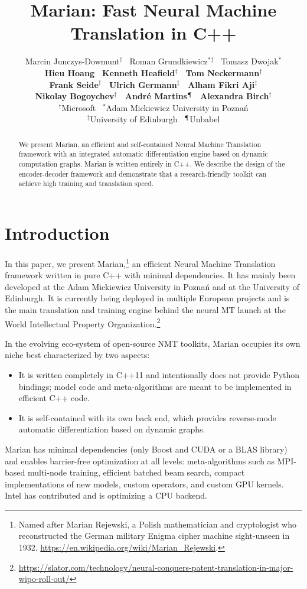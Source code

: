 \documentclass[11pt,a4paper]{article}
\title{Marian: Fast Neural Machine Translation in C++}
\author{Marcin Junczys-Dowmunt$^{\dagger}$ \, Roman Grundkiewicz$^{*}$$^{\ddagger}$ \, Tomasz Dwojak$^{*}$ \\ {\bf Hieu Hoang \, Kenneth Heafield$^{\ddagger}$ \, Tom Neckermann$^{\ddagger}$ }  \\  {\bf Frank Seide$^{\dagger}$ \, Ulrich Germann$^{\ddagger}$ \, Alham Fikri Aji$^{\ddagger}$ } \\ { \bf Nikolay Bogoychev$^{\ddagger}$ \, Andr\'{e} Martins$^{\mathparagraph}$ \, Alexandra Birch$^{\ddagger}$} \\[2mm]
$^{\dagger}$Microsoft \, $^{*}$Adam Mickiewicz University in Pozna\'{n} \\ $^{\ddagger}$University of Edinburgh \,  $^{\mathparagraph}$Unbabel }
\date{}
\begin{document}
\maketitle
\begin{abstract}
We present Marian, an efficient and self-contained Neural Machine Translation framework with an integrated automatic differentiation engine based on dynamic computation graphs. Marian is written entirely in C++. We describe the design of the encoder-decoder framework and demonstrate that a research-friendly toolkit can achieve high training and translation speed.  
\end{abstract}

\section{Introduction}

In this paper, we present Marian,\footnote{Named after Marian Rejewski, a Polish mathematician and cryptologist who reconstructed the German military Enigma cipher machine sight-unseen in 1932. \url{https://en.wikipedia.org/wiki/Marian_Rejewski}.} an efficient Neural Machine Translation framework written in pure C++ with minimal dependencies. It has mainly been developed at the Adam Mickiewicz University in Pozna\'{n} and at the University of Edinburgh. It is currently being deployed in multiple European projects and is the main translation and training engine behind the neural MT launch at the World Intellectual Property Organization.\footnote{\url{https://slator.com/technology/neural-conquers-patent-translation-in-major-wipo-roll-out/}}

In the evolving eco-system of open-source NMT toolkits, Marian occupies its own niche best characterized by two aspects:
\begin{itemize}
\item It is written completely in C++11 and intentionally does not provide Python bindings; model code and meta-algorithms are meant to be implemented in efficient C++ code.
\item It is self-contained with its own back end, which provides reverse-mode automatic differentiation based on dynamic graphs.
\end{itemize}

Marian has minimal dependencies (only Boost and CUDA or a BLAS library) and enables barrier-free optimization at all levels: meta-algorithms such as MPI-based multi-node training, efficient batched beam search, compact implementations of new models, custom operators, and custom GPU kernels. Intel has contributed and is optimizing a CPU backend. %
\end{document}
